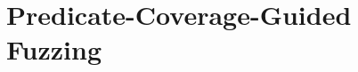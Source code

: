 \chapter[~~~~~~~~~~~~Predicate-Coverage-Guided Fuzzing]{Predicate-Coverage-Guided Fuzzing}
\label{ch:fuzzing}




